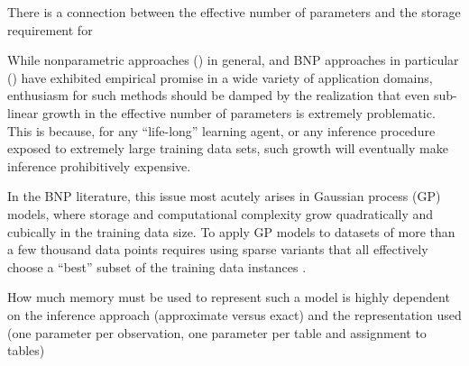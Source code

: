 {%

There is a connection between the effective number of parameters and the storage requirement for 

While nonparametric approaches (\cite{lots of shit}) in general, and BNP approaches in particular (\cite{lots more shit}) have exhibited empirical promise in a wide variety of application domains, enthusiasm for such methods should be damped by the realization that even sub-linear growth in the effective number of parameters is extremely problematic.  This is because, for any ``life-long'' learning agent, or any inference procedure exposed to extremely large training data sets, such growth will eventually make inference prohibitively expensive.  

In the BNP literature, this issue most acutely arises in Gaussian process (GP) models, where storage and computational complexity grow quadratically and cubically in the training data size.  To apply GP models to datasets of more than a few thousand data points requires using sparse variants that all effectively choose a ``best'' subset of the training data instances \cite{snelson, csato, etc}.  



How much memory must be used to represent such a model is highly dependent on the inference approach (approximate versus exact) and the representation used (one parameter per observation, one parameter per table and assignment to tables)

}
